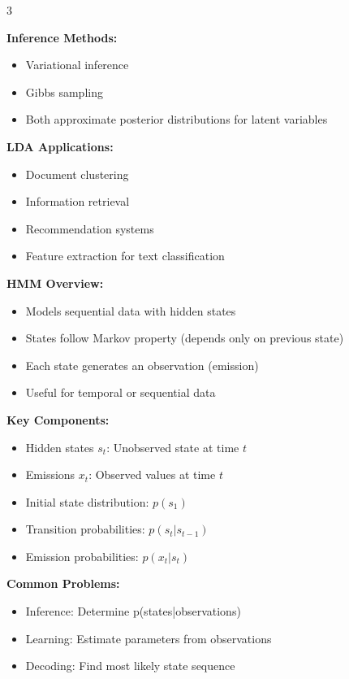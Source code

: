 \documentclass[10pt,landscape]{article}
\begin{document}
\begin{multicols}{3}
\begin{tcolorbox}[breakable, title=6.3 Latent Dirichlet Allocation (LDA), colback=mixture,boxsep=1pt,left=1pt,right=1pt,top=1pt,bottom=1pt]
\textbf{Inference Methods:}
\begin{itemize}[leftmargin=*,noitemsep,topsep=0pt]
    \item Variational inference
    \item Gibbs sampling
    \item Both approximate posterior distributions for latent variables
\end{itemize}

\textbf{LDA Applications:}
\begin{itemize}[leftmargin=*,noitemsep,topsep=0pt]
    \item Document clustering
    \item Information retrieval
    \item Recommendation systems
    \item Feature extraction for text classification
\end{itemize}
\end{tcolorbox}

\begin{tcolorbox}[breakable, title=9. Hidden Markov Models Concepts, colback=hmm,boxsep=1pt,left=1pt,right=1pt,top=1pt,bottom=1pt]
\textbf{HMM Overview:}
\begin{itemize}[leftmargin=*,noitemsep,topsep=0pt]
    \item Models sequential data with hidden states
    \item States follow Markov property (depends only on previous state)
    \item Each state generates an observation (emission)
    \item Useful for temporal or sequential data
\end{itemize}

\textbf{Key Components:}
\begin{itemize}[leftmargin=*,noitemsep,topsep=0pt]
    \item Hidden states $s_t$: Unobserved state at time $t$
    \item Emissions $x_t$: Observed values at time $t$
    \item Initial state distribution: $p(s_1)$
    \item Transition probabilities: $p(s_t|s_{t-1})$
    \item Emission probabilities: $p(x_t|s_t)$
\end{itemize}

\textbf{Common Problems:}
\begin{itemize}[leftmargin=*,noitemsep,topsep=0pt]
    \item Inference: Determine p(states|observations)
    \item Learning: Estimate parameters from observations
    \item Decoding: Find most likely state sequence
\end{itemize}


\end{tcolorbox}
\end{multicols}
\end{document}
